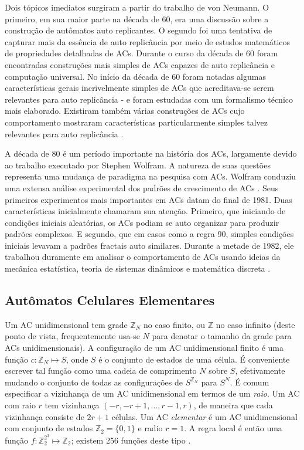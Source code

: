 \documentclass[12pt,a4paper]{article}
\begin{document}
Dois tópicos imediatos surgiram a partir do trabalho de von Neumann. O primeiro, em
sua maior parte na década de 60, era uma discussão sobre a construção de autômatos
auto replicantes. O segundo foi uma tentativa de capturar mais da essência de
auto replicância por meio de estudos matemáticos de propriedades detalhadas de
ACs. Durante o curso da década de 60 foram encontradas construções
mais simples de ACs capazes de auto replicância e computação
universal. No início da década de 60 foram notadas algumas características gerais
incrivelmente simples de ACs que acreditava-se serem relevantes para
auto replicância - e foram estudadas com um formalismo técnico mais elaborado. Existiram
também várias construções de ACs cujo comportamento mostraram
características particularmente simples talvez relevantes para auto replicância
.

A década de 80 é um período importante na história dos ACs,
largamente devido ao trabalho executado por Stephen Wolfram. A natureza de suas questões
representa uma mudança de paradigma na pesquisa com ACs. Wolfram conduziu
uma extensa análise experimental dos padrões de crescimento de ACs
. Seus primeiros experimentos mais importantes em ACs
datam do final de 1981. Duas características inicialmente chamaram sua atenção.
Primeiro, que iniciando de condições iniciais aleatórias, os ACs
podiam se auto organizar para produzir padrões complexos. E segundo, que em casos
como a regra 90, simples condições iniciais levavam a padrões fractais auto similares.
Durante a metade de 1982, ele trabalhou duramente em analisar o comportamento de
ACs usando ideias da mecânica estatística, teoria de sistemas
dinâmicos e matemática discreta .

\subsection{Autômatos Celulares Elementares}

Um AC unidimensional tem grade $\mathbb{Z}_N$ no caso finito, ou $\mathbb{Z}$
no caso infinito (deste ponto de vista, frequentemente usa-se $N$ para denotar
o tamanho da grade para ACs unidimensionais). A configuração de um AC
unidimensional finito é uma função $c: \mathbb{Z}_N \mapsto S$, onde $S$ é o
conjunto de estados de uma célula. É conveniente escrever tal função como
uma cadeia de comprimento $N$ sobre $S$, efetivamente mudando o conjunto de
todas as configurações de $S^{\mathbb{Z}_N}$ para $S^N$. É comum especificar
a vizinhança de um AC unidimensional em termos de um
\textit{raio}. Um AC com raio $r$ tem vizinhança $(-r,-r+1,\ldots,r-1,r)$,
de maneira que cada vizinhança consiste de $2r+1$ células. Um AC
\textit{elementar} é um AC unidimensional com conjunto de estados
$\mathbb{Z}_2 = \{0,1\}$ e radio $r=1$. A regra local é então uma função
$f: \mathbb{Z}^{2^3}_2 \mapsto \mathbb{Z}_2$; existem 256 funções deste
tipo .
\end{document}
